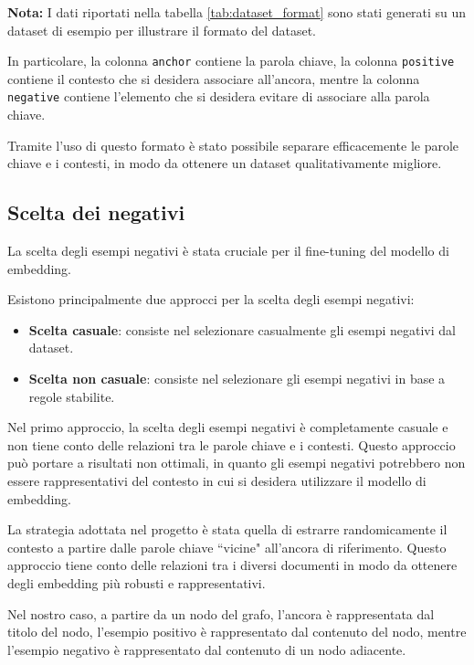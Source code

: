 \noindent
\textbf{Nota:}
I dati riportati nella tabella \ref{tab:dataset_format}
sono stati generati su un dataset di esempio per illustrare
il formato del dataset.
\newline

In particolare, la colonna \texttt{anchor} contiene la
parola chiave, la colonna \texttt{positive} contiene il
contesto che si desidera associare all'ancora, mentre la
colonna \texttt{negative} contiene l'elemento che si
desidera evitare di associare alla parola chiave.

Tramite l'uso di questo formato è stato possibile separare
efficacemente le parole chiave e i contesti, in modo da
ottenere un dataset qualitativamente migliore.

\subsection{Scelta dei negativi}
\label{sec:negatives}
La scelta degli esempi negativi è stata cruciale per il
fine-tuning del modello di embedding.

Esistono principalmente due approcci per la scelta degli
esempi negativi:

\begin{itemize}
      \item \textbf{Scelta casuale}: consiste nel selezionare
            casualmente gli esempi negativi dal dataset.
      \item \textbf{Scelta non casuale}: consiste nel
            selezionare gli esempi negativi in base a regole
            stabilite.
\end{itemize}

Nel primo approccio, la scelta degli esempi negativi è
completamente casuale e non tiene conto delle relazioni tra
le parole chiave e i contesti.
Questo approccio può portare a risultati non ottimali, in
quanto gli esempi negativi potrebbero non essere
rappresentativi del contesto in cui si desidera utilizzare
il modello di embedding.

La strategia adottata nel progetto è stata quella di
estrarre randomicamente il contesto a partire dalle parole
chiave ``vicine" all'ancora di riferimento.
Questo approccio tiene conto delle relazioni tra i diversi
documenti in modo da ottenere degli embedding più robusti e
rappresentativi.

Nel nostro caso, a partire da un nodo del grafo, l'ancora è
rappresentata dal titolo del nodo, l'esempio positivo è
rappresentato dal contenuto del nodo, mentre l'esempio
negativo è rappresentato dal contenuto di un nodo
adiacente.

